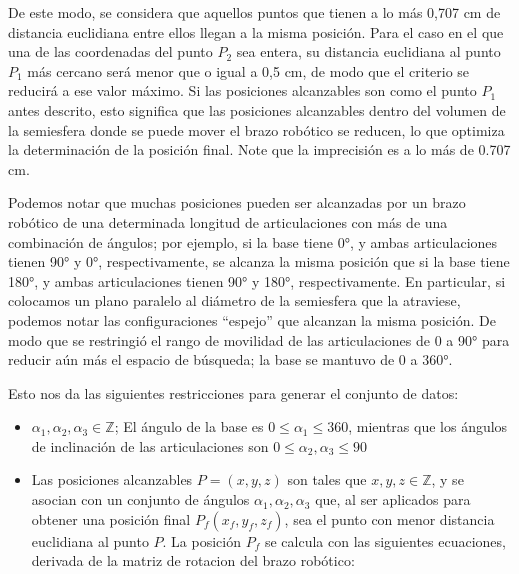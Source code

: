 De este modo, se considera que aquellos puntos que tienen a lo más 0,707 cm de distancia euclidiana entre ellos llegan a la misma posición. Para el caso en el que una de las coordenadas del punto $P_2$ sea entera, su distancia euclidiana al punto $P_1$ más cercano será menor que o igual a 0,5 cm, de modo que el criterio se reducirá a ese valor máximo. Si las posiciones alcanzables son como el punto $P_1$ antes descrito, esto significa que las posiciones alcanzables dentro del volumen de la semiesfera donde se puede mover el brazo robótico se reducen, lo que optimiza la determinación de la posición final. Note que la imprecisión es a lo más de 0.707 cm. 

Podemos notar que muchas posiciones pueden ser alcanzadas por un brazo robótico de una determinada longitud de articulaciones con más de una combinación de ángulos; por ejemplo, si la base tiene 0°, y ambas articulaciones tienen 90° y 0°, respectivamente, se alcanza la misma posición que si la base tiene 180°, y ambas articulaciones tienen 90° y 180°, respectivamente. En particular, si colocamos un plano paralelo al diámetro de la semiesfera que la atraviese, podemos notar las configuraciones ``espejo'' que alcanzan la misma posición. De modo que se restringió el rango de movilidad de las articulaciones de 0 a 90° para reducir aún más el espacio de búsqueda; la base se mantuvo de 0 a 360°. 


Esto nos da las siguientes restricciones para generar el conjunto de datos:

\begin{itemize} 
	
	\item $\alpha_1, \alpha_2, \alpha_3 \in \mathbb{Z}$; El ángulo de la base es $ 0 \leq \alpha_1 \leq 360$, mientras que los ángulos de inclinación de las articulaciones son $ 0 \leq \alpha_2, \alpha_3 \leq 90$
	
	\item Las posiciones alcanzables $P = (x, y, z)$ son tales que $x,y,z \in \mathbb{Z}$, y se asocian con un conjunto de ángulos $\alpha_1, \alpha_2, \alpha_3$ que, al ser aplicados para obtener una posición final $P_f(x_f,y_f,z_f)$, sea el punto con menor distancia euclidiana al punto $P$. La posición $P_f$ se calcula con las siguientes ecuaciones, derivada de la matriz de rotacion del brazo robótico:
	
\end{itemize}

